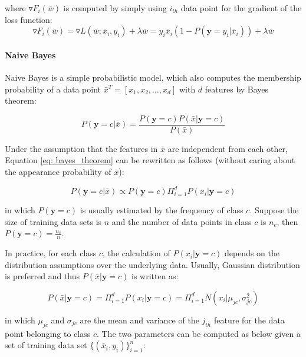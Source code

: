 where $\triangledown F_i(\bar{w})$ is computed by simply using $i_{th}$ data point for the gradient of the loss function:
\begin{equation}
    \triangledown F_i(\bar{w}) = \triangledown L(\bar{w};\bar{x}_i,y_i) + \lambda \bar{w} = y_i\bar{x}_i(1-P(\textbf{y}=y_i|\bar{x}_i)) + \lambda \bar{w}
\end{equation}

\paragraph{Naive Bayes} Naive Bayes is a simple probabilistic model, which also computes the membership probability of a data point $\bar{x}^T = [x_1, x_2, \dots, x_d]$ with $d$ features by Bayes theorem:

\begin{equation}\label{eq: bayes_theorem}
P(\textbf{y}=c|\bar{x}) = \frac{P(\textbf{y}=c)P(\bar{x}|\textbf{y}=c)}{P(\bar{x})}    
\end{equation}

Under the assumption that the features in $\bar{x}$ are independent from each other, Equation \ref{eq: bayes_theorem} can be rewritten as follows (without caring about the appearance probability of $\bar{x}$):

\begin{equation}\label{eq: nb_exp}
    P(\textbf{y}=c|\bar{x}) \propto P(\textbf{y}=c)\Pi_{i=1}^dP(x_i|\textbf{y}=c)
\end{equation}

in which $P(\textbf{y}=c)$ is usually estimated by the frequency of class $c$. Suppose the size of training data sets is $n$ and the number of data points in class $c$ is $n_c$, then $P(\textbf{y}=c) = \frac{n_c}{n}$.

In practice, for each class $c$, the calculation of $P(x_i|\textbf{y}=c)$ depends on the distribution assumptions over the underlying data. Usually, Gaussian distribution is preferred and thus $P(\bar{x}|\textbf{y}=c)$ is written as:

\begin{equation}\label{eq: nb_guassian}
    P(\bar{x}|\textbf{y}=c) = \Pi_{i=1}^dP(x_i|\textbf{y}=c) = \Pi_{i=1}^dN(x_i|\mu_{jc}, \sigma_{jc}^2)
\end{equation}

in which $\mu_{jc}$ and $\sigma_{jc}$ are the mean and variance of the $j_{th}$ feature for the data point belonging to class $c$. The two parameters can be computed as below given a set of training data set $\{(\bar{x}_i, y_i)\}_{i=1}^n$:

